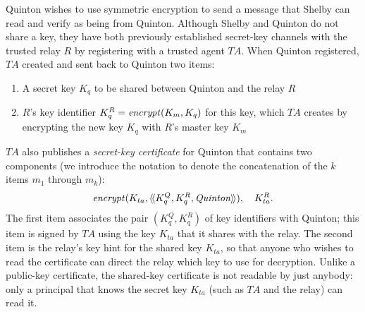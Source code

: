 \begin{example}\label{ex:relays}
  Quinton wishes to use symmetric encryption to send a message that
  Shelby can read and verify as being from Quinton.  Although Shelby
  and Quinton do not share a key, they have both previously
  established secret-key channels with the trusted relay $R$ by
  registering with a trusted agent $TA$.  When Quinton registered,
  $TA$ created and sent back to Quinton two items:
  \begin{enumerate}
  \item A secret key $K_q$ to be shared between Quinton and the relay
    $R$
  \item $R$'s key identifier $K_q^R = \encrypt{K_q}{K_m}$ for this key,
    which $TA$ creates by encrypting the new key $K_q$ with $R$'s master
    key $K_m$
  \end{enumerate}
  $TA$ also publishes a \emph{secret-key certificate} for Quinton that
  contains two components
  (we introduce the
  notation  to denote the concatenation of
  the $k$ items $m_1$ through $m_k$):
  \[ \encrypt{\cat{K_q^Q,K_q^R,\name{Quinton}}}{K_{ta}}, \quad
  K_{ta}^R. \]
  The first item associates the pair $(K_q^Q, K_q^R)$ of key identifiers
  with Quinton; this item is signed by $TA$ using the key $K_{ta}$ that
  it shares with the relay.  The second item is the relay's key hint for
  the shared key $K_{ta}$, so that anyone who wishes to read the
  certificate can direct the relay which key to use for decryption.
  Unlike a public-key certificate, the shared-key certificate
  is not readable by just anybody: only a principal that knows the
  secret key $K_{ta}$ (such as $TA$ and the relay) can read it.



\end{example}
